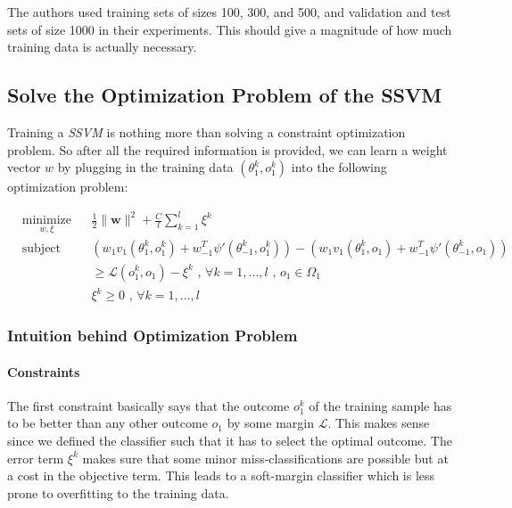 \documentclass[]{article}
\begin{document}
\noindent The authors used training sets of sizes 100, 300, and 500, and validation and test sets of size 1000 in their experiments. This should give a magnitude of how much training data is actually necessary.

\newpage
\subsection{Solve the Optimization Problem of the SSVM}
Training a \emph{SSVM} is nothing more than solving a constraint optimization problem. So after all the required information is provided, we can learn a weight vector $w$ by plugging in the training data $(\theta_{1}^{k}, o_{1}^{k})$ into the following optimization problem:

\begin{equation*}
\begin{aligned}
& \underset{w, \xi}{\text{minimize}}
& & \frac{1}{2} \lVert \mathbf{w} \rVert^{2} + \frac{C}{l} \sum_{k=1}^{l} \xi^{k}\\
& \text{subject to}
& & (w_{1}v_{1}(\theta_{1}^{k}, o_{1}^{k}) + w_{-1}^{T}\psi'(\theta_{-1}^{k},o_{1}^k)) -  (w_{1}v_{1}(\theta_{1}^{k},o_{1})+w_{-1}^{T}\psi'(\theta_{-1}^{k},o_{1})) \\ & & & 
\geq \mathcal{L}(o_{1}^{k},o_{1}) - \xi^{k}\text{ , } 	\forall k = 1,...,l \text{ , } o_{1} \in \Omega_{1} \\ & & &
\xi^{k} \geq 0 \text{ , } 	\forall k = 1,...,l
\end{aligned}
\end{equation*}

\subsubsection{Intuition behind Optimization Problem}

\paragraph{Constraints} The first constraint basically says that the outcome $o_{1}^{k}$ of the training sample has to be better than any other outcome $o_{1}$ by some margin $\mathcal{L}$. This makes sense since we defined the classifier such that it has to select the optimal outcome.
The error term $\xi^{k}$ makes sure that some minor miss-classifications are possible but at a cost in the objective term. This leads to a soft-margin classifier which is less prone to overfitting to the training data.
\end{document}
